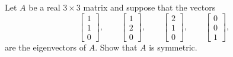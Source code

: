 \begin{problem}
	Let $ A $ be a real $ 3\times 3 $ matrix and suppose that the vectors
	\[ \begin{bmatrix}
		1 \\ 1 \\ 0
	\end{bmatrix}, \qquad
	\begin{bmatrix}
		1 \\ 2 \\ 0
	\end{bmatrix}, \qquad
	\begin{bmatrix}
		2 \\ 1 \\ 0
	\end{bmatrix}, \qquad
	\begin{bmatrix}
		0 \\ 0 \\ 1
	\end{bmatrix}, \]
	are the eigenvectors of $ A $. Show that $ A $ is symmetric.
\end{problem}




